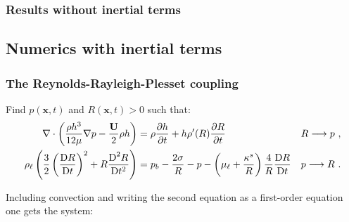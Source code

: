 \documentclass[10pt,aspectratio=169]{beamer}
\begin{document}
\begin{frame}\frametitle{Results without inertial terms}\vspace*{0.5cm}
\begin{center}
	\begin{minipage}{0.9\textwidth}
		\centering 
	\end{minipage}
\end{center}

\end{frame}

\subsection{Numerics with inertial terms}
\setcounter{showSlideNumbers}{0}
\begin{frame}[noframenumbering]
\tableofcontents[
currentsection,
currentsubsection,
subsectionstyle=show/shaded/hide
]
\end{frame}
\setcounter{showSlideNumbers}{1}

\begin{frame}
\frametitle{The Reynolds-Rayleigh-Plesset coupling}

Find $p(\mathbf{x},t)$ and $R(\mathbf{x},t)>0$ such that:
\begin{align*}
\nabla\cdot\left(\frac{\rho h^3}{12\mu }\nabla p-\frac{\mathbf{U}}{2}\rho h \right)&=\rho \frac{\partial h}{\partial t}+h \rho'(R)\frac{\partial R}{\partial t}&&R \longrightarrow p~,\\
\rho_\ell\left(\frac{3}{2}\left(\frac{\mbox{D} R}{\mbox{D} t}\right)^2+R\frac{\mbox{D}^2 R}{\mbox{D} {t}^2}\right)&=p_b-\frac{2\sigma}{R}-p-\left(\mu_\ell+\frac{\kappa^s}{R}\right)\frac{4}{R}\frac{\mbox{D} R}{\mbox{D} t}&&p\longrightarrow R~.
\end{align*}

Including convection and writing the second equation as a first-order equation one gets the system:
\end{frame}  
\end{document}
